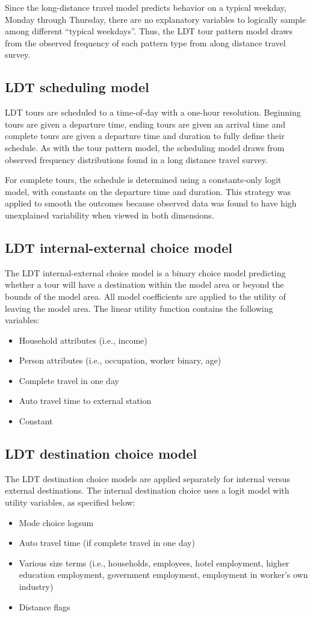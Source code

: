 Since the long-distance travel model predicts behavior on a typical weekday, Monday through Thursday, there are no explanatory variables to logically sample among different ``typical weekdays''. Thus, the LDT tour pattern model draws from the observed frequency of each pattern type from along distance travel survey.

\subsection{LDT scheduling model}
LDT tours are scheduled to a time-of-day with a one-hour resolution. Beginning tours are given a departure time, ending tours are given an arrival time and complete tours are given a departure time and duration to fully define their schedule. As with the tour pattern model, the scheduling model draws from observed frequency distributions found in a long distance travel survey.

For complete tours, the schedule is determined using a constants-only logit model, with constants on the departure time and duration. This strategy was applied to smooth the outcomes because observed data was found to have high unexplained variability when viewed in both dimensions.

\subsection{LDT internal-external choice model}\label{sec:ldt-internal-external}
The LDT internal-external choice model is a binary choice model predicting whether a tour will have a destination within the model area or beyond the bounds of the model area. All model coefficients are applied to the utility of leaving the model area. The linear utility function contains the following variables:
\begin{itemize}
\item Household attributes (i.e., income)
\item Person attributes (i.e., occupation, worker binary, age)
\item Complete travel in one day
\item Auto travel time to external station
\item Constant
\end{itemize}

\subsection{LDT destination choice model}
The LDT destination choice models are applied separately for internal versus external destinations. The internal destination choice uses a logit model with utility variables, as specified below:
\begin{itemize}
\item Mode choice logsum
\item Auto travel time (if complete travel in one day)
\item Various size terms (i.e., households, employees, hotel employment, higher education employment, government employment, employment in worker's own industry)
\item Distance flags
\end{itemize}

